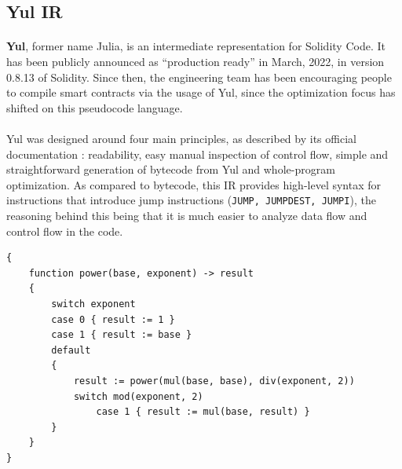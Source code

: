 

\subsection*{Yul IR}
\paragraph*{}
\textbf{Yul}, former name Julia, is an intermediate representation for Solidity Code. It has been publicly announced as ``production ready'' in March, 2022, in version 0.8.13 of Solidity. Since then, the engineering team has been encouraging people to compile smart contracts via the usage of Yul, since the optimization focus has shifted on this pseudocode language.

\paragraph*{}
Yul was designed around four main principles, as described by its official documentation \cite{yul-description}: readability, easy manual inspection of control flow, simple and straightforward generation of bytecode from Yul and whole-program optimization. As compared to bytecode, this IR provides high-level syntax for instructions that introduce jump instructions (\lstinline[columns=fixed]{JUMP, JUMPDEST, JUMPI}), the reasoning behind this being that it is much easier to analyze data flow and control flow in the code.

\begin{lstlisting}[caption={Example of Yul code which computes exponentiation recursively}]
{
    function power(base, exponent) -> result
    {
        switch exponent
        case 0 { result := 1 }
        case 1 { result := base }
        default
        {
            result := power(mul(base, base), div(exponent, 2))
            switch mod(exponent, 2)
                case 1 { result := mul(base, result) }
        }
    }
}
\end{lstlisting}

